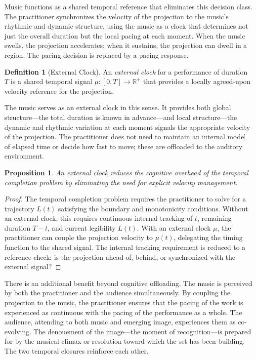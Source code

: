 \documentclass[11pt, twoside]{article}
\theoremstyle{plain}
\newtheorem{proposition}[theorem]{Proposition}
\theoremstyle{definition}
\newtheorem{definition}[theorem]{Definition}
\theoremstyle{remark}
\begin{document}
Music functions as a shared temporal reference that eliminates this decision class. The practitioner synchronizes the velocity of the projection to the music's rhythmic and dynamic structure, using the music as a clock that determines not just the overall duration but the local pacing at each moment. When the music swells, the projection accelerates; when it sustains, the projection can dwell in a region. The pacing decision is replaced by a pacing response.

\begin{definition}[External Clock]
An \emph{external clock} for a performance of duration $T$ is a shared temporal signal $\mu : [0, T] \to \mathbb{R}^+$ that provides a locally agreed-upon velocity reference for the projection.
\end{definition}

The music serves as an external clock in this sense. It provides both global structure---the total duration is known in advance---and local structure---the dynamic and rhythmic variation at each moment signals the appropriate velocity of the projection. The practitioner does not need to maintain an internal model of elapsed time or decide how fast to move; these are offloaded to the auditory environment.

\begin{proposition}
\label{prop:music-clock}
An external clock reduces the cognitive overhead of the temporal completion problem by eliminating the need for explicit velocity management.
\end{proposition}

\begin{proof}
The temporal completion problem requires the practitioner to solve for a trajectory $L(t)$ satisfying the boundary and monotonicity conditions. Without an external clock, this requires continuous internal tracking of $t$, remaining duration $T - t$, and current legibility $L(t)$. With an external clock $\mu$, the practitioner can couple the projection velocity to $\mu(t)$, delegating the timing function to the shared signal. The internal tracking requirement is reduced to a reference check: is the projection ahead of, behind, or synchronized with the external signal?
\end{proof}

There is an additional benefit beyond cognitive offloading. The music is perceived by both the practitioner and the audience simultaneously. By coupling the projection to the music, the practitioner ensures that the pacing of the work is experienced as continuous with the pacing of the performance as a whole. The audience, attending to both music and emerging image, experiences them as co-evolving. The denouement of the image---the moment of recognition---is prepared for by the musical climax or resolution toward which the set has been building. The two temporal closures reinforce each other.
\end{document}
